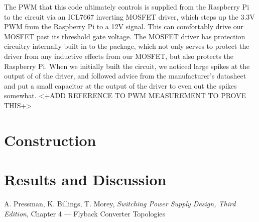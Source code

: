 \documentclass[a4paper, 12pt]{article}
\begin{document}
The PWM that this code ultimately controls is supplied from the Raspberry Pi to
the circuit via an ICL7667 inverting MOSFET driver, which steps up the 3.3V PWM
from the Raspberry Pi to a 12V signal. This can comfortably drive our MOSFET
past its threshold gate voltage. The MOSFET driver has protection circuitry
internally built in to the package, which not only serves to protect the driver
from any inductive effects from our MOSFET, but also protects the Raspberry Pi.
When we initially built the circuit, we noticed large spikes at the output of
of the driver, and followed advice from the manufacturer's datasheet and put a
small capacitor at the output of the driver to even out the spikes somewhat.
<+ADD REFERENCE TO PWM MEASUREMENT TO PROVE THIS+>



\section{Construction}


\section{Results and Discussion}


\begin{thebibliography}{0}
	 A. Pressman, K. Billings, T. Morey, \textit{Switching Power Supply Design, Third Edition}, Chapter 4 --- Flyback Converter Topologies
\end{thebibliography}
\end{document}
